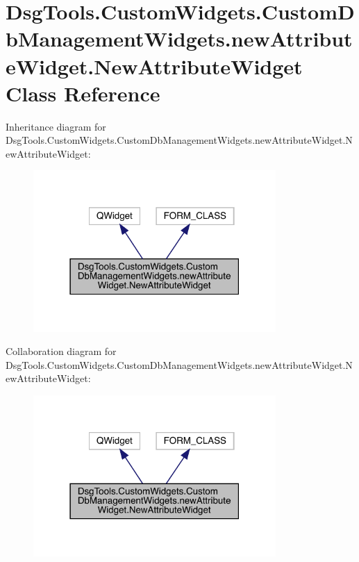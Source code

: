 \hypertarget{class_dsg_tools_1_1_custom_widgets_1_1_custom_db_management_widgets_1_1new_attribute_widget_1_1_new_attribute_widget}{}\section{Dsg\+Tools.\+Custom\+Widgets.\+Custom\+Db\+Management\+Widgets.\+new\+Attribute\+Widget.\+New\+Attribute\+Widget Class Reference}
\label{class_dsg_tools_1_1_custom_widgets_1_1_custom_db_management_widgets_1_1new_attribute_widget_1_1_new_attribute_widget}


Inheritance diagram for Dsg\+Tools.\+Custom\+Widgets.\+Custom\+Db\+Management\+Widgets.\+new\+Attribute\+Widget.\+New\+Attribute\+Widget\+:
\nopagebreak
\begin{figure}[H]
\begin{center}
\leavevmode
\includegraphics[width=262pt]{class_dsg_tools_1_1_custom_widgets_1_1_custom_db_management_widgets_1_1new_attribute_widget_1_1_15e1f5cc619d6335c077c834bf47264b}
\end{center}
\end{figure}


Collaboration diagram for Dsg\+Tools.\+Custom\+Widgets.\+Custom\+Db\+Management\+Widgets.\+new\+Attribute\+Widget.\+New\+Attribute\+Widget\+:
\nopagebreak
\begin{figure}[H]
\begin{center}
\leavevmode
\includegraphics[width=262pt]{class_dsg_tools_1_1_custom_widgets_1_1_custom_db_management_widgets_1_1new_attribute_widget_1_1_39bc4a9dee40cd45b6037fd656597e2a}
\end{center}
\end{figure}

